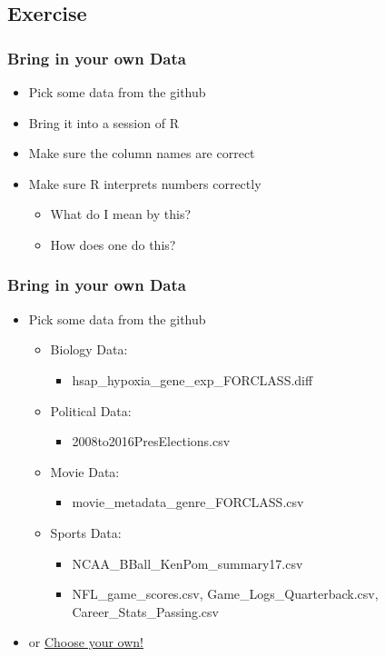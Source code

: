 \documentclass[14pt]{beamer}
\begin{document}
\subsection{Exercise}

\begin{frame}
\frametitle{Bring in your own Data}
\begin{itemize}
	\item Pick some data from the github
	\item Bring it into a session of R
	\item Make sure the column names are correct
	\item Make sure R interprets numbers correctly
	\begin{itemize}
		\item What do I mean by this?
		\item How does one do this?
	\end{itemize}
\end{itemize}
\end{frame}

\begin{frame}
\frametitle{Bring in your own Data}
\begin{itemize}
	\item Pick some data from the github
	\begin{itemize}
		\item Biology Data:
		\begin{itemize}
			\item hsap\_hypoxia\_gene\_exp\_FORCLASS.diff
		\end{itemize}
		\item Political Data:
		\begin{itemize}
			\item 2008to2016PresElections.csv
		\end{itemize}
		\item Movie Data:
		\begin{itemize}
			\item movie\_metadata\_genre\_FORCLASS.csv
		\end{itemize}
		\item Sports Data: 
		\begin{itemize}
			\item NCAA\_BBall\_KenPom\_summary17.csv
			\item NFL\_game\_scores.csv, Game\_Logs\_Quarterback.csv, Career\_Stats\_Passing.csv
		\end{itemize}
	\end{itemize}
	\item or \href{https://www.kaggle.com/}{Choose your own!}
\end{itemize}
\end{frame}
\end{document}
